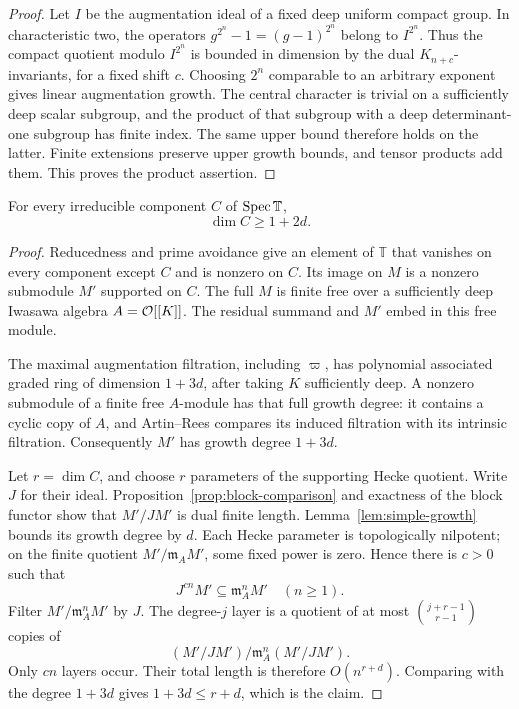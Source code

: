 \begin{proof}
Let \(I\) be the augmentation ideal of a fixed deep
uniform compact group. In characteristic two, the
operators \(g^{2^n}-1=(g-1)^{2^n}\) belong to
\(I^{2^n}\). Thus the compact quotient modulo
\(I^{2^n}\) is bounded in dimension by the dual
\(K_{n+c}\)-invariants, for a fixed shift \(c\).
Choosing \(2^n\) comparable to an arbitrary exponent
gives linear augmentation growth.
The central character is trivial on a sufficiently
deep scalar subgroup, and the product of that subgroup
with a deep determinant-one subgroup has finite index.
The same upper bound therefore holds on the latter.
Finite extensions preserve upper growth bounds, and
tensor products add them. This proves the product
assertion.
\end{proof}

\begin{proposition}\label{prop:hecke-dimension}
For every irreducible component \(C\) of
\(\operatorname{Spec}\mathbb T\),
\[
 \dim C\ge1+2d.
\]
\end{proposition}
\begin{proof}
Reducedness and prime avoidance give an element of
\(\mathbb T\) that vanishes on every component except
\(C\) and is nonzero on \(C\). Its image on \(M\) is
a nonzero submodule \(M'\) supported on \(C\).
The full \(M\) is finite free over a sufficiently deep
Iwasawa algebra \(A=\mathcal O[[K]]\).
The residual summand and \(M'\) embed in this free module.

The maximal augmentation filtration, including
\(\varpi\), has polynomial associated graded ring of
dimension \(1+3d\), after taking \(K\) sufficiently
deep. A nonzero submodule of a finite free \(A\)-module
has that full growth degree: it contains a cyclic
copy of \(A\), and Artin--Rees compares its induced
filtration with its intrinsic filtration.
Consequently \(M'\) has growth degree \(1+3d\).

Let \(r=\dim C\), and choose \(r\) parameters of the
supporting Hecke quotient. Write \(J\) for their ideal.
Proposition~\ref{prop:block-comparison} and exactness of
the block functor show that \(M'/JM'\) is dual finite
length. Lemma~\ref{lem:simple-growth} bounds its growth
degree by \(d\).
Each Hecke parameter is topologically nilpotent; on the
finite quotient \(M'/\mathfrak m_A M'\), some fixed
power is zero. Hence there is \(c>0\) such that
\[
 J^{cn}M'\subseteq\mathfrak m_A^nM'
 \quad(n\ge1).
\]
Filter \(M'/\mathfrak m_A^nM'\) by \(J\).
The degree-\(j\) layer is a quotient of at most
\(\binom{j+r-1}{r-1}\) copies of
\[
 (M'/JM')/\mathfrak m_A^n(M'/JM').
\]
Only \(cn\) layers occur. Their total length is therefore
\(O(n^{r+d})\).
Comparing with the degree \(1+3d\) gives
\(1+3d\le r+d\), which is the claim.
\end{proof}

